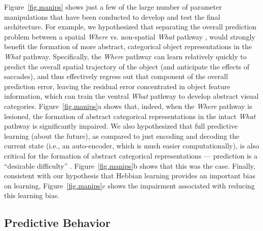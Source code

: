 \documentclass[11pt,twoside]{article}
\newif\myifpdf
\begin{document}
Figure~\ref{fig.manips} shows just a few of the large number of parameter manipulations that have been conducted to develop and test the final architecture.  For example, we hypothesized that separating the overall prediction problem between a spatial \emph{Where} vs. non-spatial \emph{What} pathway \citep{UngerleiderMishkin82,GoodaleMilner92}, would strongly benefit the formation of more abstract, categorical object representations in the \emph{What} pathway.  Specifically, the \emph{Where} pathway can learn relatively quickly to predict the overall spatial trajectory of the object (and anticipate the effects of saccades), and thus effectively regress out that component of the overall prediction error, leaving the residual error concentrated in object feature information, which can train the ventral \emph{What} pathway to develop abstract visual categories.  Figure~\ref{fig.manips}a shows that, indeed, when the \emph{Where} pathway is lesioned, the formation of abstract categorical representations in the intact \emph{What} pathway is significantly impaired.  We also hypothesized that full predictive learning (about the future), as compared to just encoding and decoding the current state (i.e., an auto-encoder, which is much easier computationally), is also critical for the formation of abstract categorical representations --- prediction is a ``desirable difficulty'' \citep{Bjork94}.  Figure~\ref{fig.manips}b shows that this was the case.  Finally, consistent with our hypothesis that Hebbian learning provides an important bias on learning, Figure~\ref{fig.manips}c shows the impairment associated with reducing this learning bias.

\subsection{Predictive Behavior}
\end{document}
